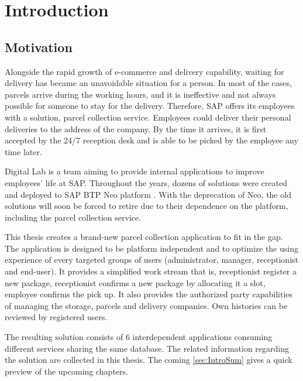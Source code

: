\chapter{Introduction}
\label{ch:intro}

\section{Motivation}
Alongside the rapid growth of e-commerce and delivery capability, waiting for delivery has became an unavoidable situation for a person. In most of the cases, parcels arrive during the working hours, and it is ineffective and not always possible for someone to stay for the delivery. Therefore, SAP \cite{sap} offers its employees with a solution, parcel collection service. Employees could deliver their personal deliveries to the address of the company. By the time it arrives, it is first accepted by the 24/7 reception desk and is able to be picked by the employee any time later.

Digital Lab is a team aiming to provide internal applications to improve employees' life at SAP. Throughout the years, dozens of solutions were created and deployed to SAP BTP \cite{btp} Neo platform \cite{neo}. With the deprecation of Neo, the old solutions will soon be forced to retire due to their dependence on the platform, including the parcel collection service.

This thesis creates a brand-new parcel collection application to fit in the gap. The application is designed to be platform independent and to optimize the using experience of every targeted groups of users (administrator, manager, receptionist and end-user). It provides a simplified work stream that is, receptionist register a new package, receptionist confirms a new package by allocating it a slot, employee confirms the pick up. It also provides the authorized party capabilities of managing the storage, parcels and delivery companies. Own histories can be reviewed by registered users.

The resulting solution consists of 6 interdependent applications consuming different services sharing the same database. The related information regarding the solution are collected in this thesis. The coming \autoref{sec:IntroSum} gives a quick preview of the upcoming chapters.



